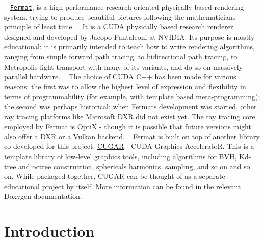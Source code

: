 

\begin{DoxyParagraph}{}
~\newline
 \href{https://github.com/NVlabs/fermat}{\tt Fermat}, is a high performance research oriented physically based rendering system, trying to produce beautiful pictures following the mathematician\textquotesingle{}s principle of least time. ~\newline
 It is a C\+U\+DA physically based research renderer designed and developed by Jacopo Pantaleoni at N\+V\+I\+D\+IA. Its purpose is mostly educational\+: it is primarily intended to teach how to write rendering algorithms, ranging from simple forward path tracing, to bidirectional path tracing, to Metropolis light transport with many of its variants, and do so on massively parallel hardware. ~\newline
 The choice of C\+U\+DA C++ has been made for various reasons\+: the first was to allow the highest level of expression and flexibility in terms of programmability (for example, with template based meta-\/programming); the second was perhaps historical\+: when Fermat\textquotesingle{}s development was started, other ray tracing platforms like Microsoft D\+XR did not exist yet. The ray tracing core employed by Fermat is OptiX -\/ though it is possible that future versions might also offer a D\+XR or a Vulkan backend. ~\newline
 Fermat is built on top of another library co-\/developed for this project\+: \hyperlink{cugar_page}{C\+U\+G\+AR} -\/ C\+U\+DA Graphics AcceleratoR. This is a template library of low-\/level graphics tools, including algorithms for B\+VH, Kd-\/tree and octree construction, sphericals harmonics, sampling, and so on and so on. While packaged together, C\+U\+G\+AR can be thought of as a separate educational project by itself. More information can be found in the relevant Doxygen documentation.
\end{DoxyParagraph}
\hypertarget{index_FermatIntroductionSection}{}\section{Introduction}\label{index_FermatIntroductionSection}
